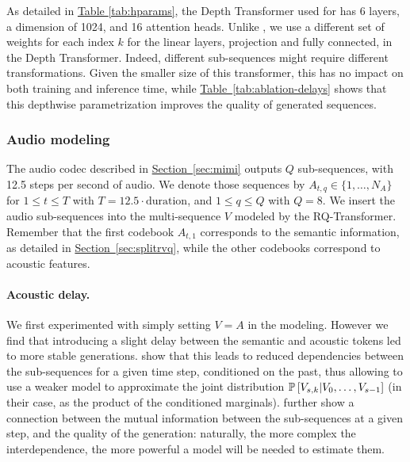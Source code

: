 As detailed in \hyperref[tab:hparams]{Table \ref{tab:hparams}}, the Depth Transformer used for \ours has 6 layers, a dimension of 1024, and 16 attention heads. Unlike \citet{rqtransformer}, we use a different set of weights for each index $k$ for the linear layers, projection and fully connected, in the Depth Transformer. Indeed, different sub-sequences might require different transformations. Given the smaller size of this transformer, this has no impact on both training and inference time, while \hyperref[tab:ablation-delays]{Table~\ref{tab:ablation-delays}} shows that this depthwise parametrization improves the quality of generated sequences. 

\subsubsection{Audio modeling}
\label{sec:audio_modeling}

The audio codec \mimi{} described in \hyperref[sec:mimi]{Section~\ref{sec:mimi}} outputs $Q$ sub-sequences, with 12.5 steps per second of audio. We denote those sequences by $A_{t, q} \in \{1, \ldots, N_A\}$ for $1 \leq t \leq T$ with $T = 12.5 \cdot \mathrm{duration}$, and $1 \leq q \leq Q$ with $Q=8$. 
We insert the audio sub-sequences into the multi-sequence $V$ modeled by the RQ-Transformer. Remember that the first codebook $A_{t, 1}$ corresponds to the semantic information, as detailed in \hyperref[sec:splitrvq]{Section~\ref{sec:splitrvq}}, while the other codebooks correspond to acoustic features. 

\paragraph{Acoustic delay.}

We first experimented with simply setting $V = A$ in the modeling. However we find that introducing a slight delay between the semantic and acoustic tokens led to more stable generations. \citet{musicgen} show that this leads to reduced dependencies between the sub-sequences for a given time step, conditioned on the past, thus allowing to use a weaker model to approximate the joint distribution $\mathbb{P}\left[V_{s, k} | V_{0}, \ldots, V_{s-1}\right]$ (in their case, as the product of the conditioned marginals). \citet{lemercier2024mmd} further show a connection between the mutual information between the sub-sequences at a given step, and the quality of the generation: naturally, the more complex the interdependence, the more powerful a model will be needed to estimate them. 

